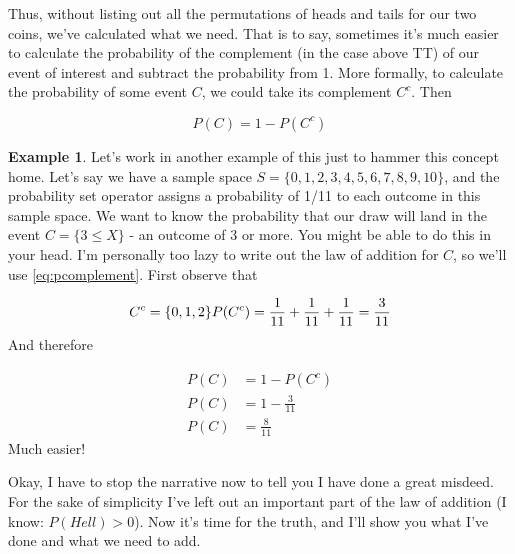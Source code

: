 \documentclass[
]{book}
\theoremstyle{definition}
\theoremstyle{definition}
\newtheorem{example}{Example}[chapter]
\theoremstyle{definition}
\theoremstyle{definition}
\theoremstyle{remark}
\begin{document}
Thus, without listing out all the permutations of heads and tails for our two coins, we've calculated what we need. That is to say, sometimes it's much easier to calculate the probability of the complement (in the case above TT) of our event of interest and subtract the probability from 1. More formally, to calculate the probability of some event \(C\), we could take its complement \(C^c\). Then

\[
P(C) = 1 - P(C^c) 
\label{eq:pcomplement}
\]

\begin{example}
Let's work in another example of this just to hammer this concept home. Let's say we have a sample space \(S = \{0,1,2,3,4,5,6,7,8,9,10\}\), and the probability set operator assigns a probability of 1/11 to each outcome in this sample space. We want to know the probability that our draw will land in the event \(C = \{3 \leq X\}\) - an outcome of 3 or more. You might be able to do this in your head. I'm personally too lazy to write out the law of addition for \(C\), so we'll use \eqref{eq:pcomplement}. First observe that

\[
C^c = \{0,1,2\}\\
P(C^c) = \frac{1}{11} + \frac{1}{11} + \frac{1}{11} = \frac{3}{11}
\]
And therefore

\begin{align}
P(C) &= 1 - P(C^c) \\
P(C) &= 1 - \frac{3}{11} \\
P(C) &= \frac{8}{11}
\end{align}
Much easier!
\end{example}

Okay, I have to stop the narrative now to tell you I have done a great misdeed. For the sake of simplicity I've left out an important part of the law of addition (I know: \(P({Hell}) > 0\)). Now it's time for the truth, and I'll show you what I've done and what we need to add.
\end{document}
